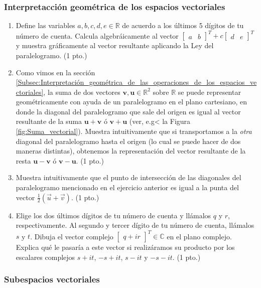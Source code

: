 \documentclass[12pt]{article}
\begin{document}
\subsubsection{Interpretacción geométrica de los espacios vectoriales}

\begin{enumerate}
        \item Define las variables $a,b,c,d,e\in\mathbb{R}$ de acuerdo a los últimos 5 dígitos de tu número de cuenta. Calcula algebráicamente al vector $\begin{bmatrix}a & b\end{bmatrix}^T+c\begin{bmatrix}d & e\end{bmatrix}^T$ y muestra gráficamente al vector resultante aplicando la Ley del paralelogramo. (1 pto.)
                \item Como vimos en la sección \ref{Subsec:Interpretación_geométrica_de_las_operaciones_de_los_espacios_vectoriales}, la suma de dos vectores $\mathbf{v},\mathbf{u}\in\mathbb{R}^2$ sobre $\mathbb{R}$ se puede representar geométricamente con ayuda de un paralelogramo en el plano cartesiano, en donde la diagonal del paralelogramo que sale del origen es igual al vector resultante de la suma $\mathbf{u}+\mathbf{v}$ ó $\mathbf{v}+\mathbf{u}$ (ver, e.g< la Figura \ref{fig:Suma_vectorial}). Muestra intuitivamente que si transportamos a la \emph{otra} diagonal del paralelogramo hasta el origen (lo cual se puede hacer de dos maneras distintas), obtenemos la representación del vector resultante de la resta $\mathbf{u}-\mathbf{v}$ ó $\mathbf{v}-\mathbf{u}$. (1 pto.)
                        \item Muestra intuitivamente que el punto de intersección de las diagonales del paralelogramo mencionado en el ejercicio anterior es igual a la punta del vector $\frac{1}{2}(\vec{u}+\vec{v})$. (1 pto.)
                                \item Elige los dos últimos dígitos de tu número de cuenta y llámalos $q$ y $r$, respectivamente. Al segundo y tercer dígito de tu número de cuenta, llámalos $s$ y $t$. Dibuja el vector complejo $\begin{bmatrix} q + ir \end{bmatrix}^T\in\mathbb{C}$ en el plano complejo. Explica qué le pasaría a este vector si realizáramos su producto por los escalares complejos $s+it$, $-s+it$, $s-it$ y $-s-it$. (1 pto.)
\end{enumerate}

\subsubsection{Subespacios vectoriales}
\end{document}
